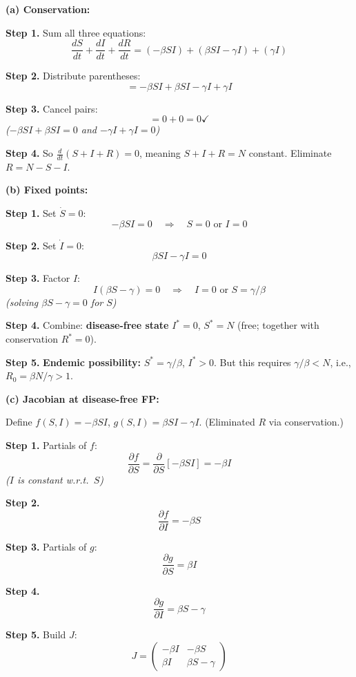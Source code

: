 \documentclass[10pt]{article}
\newcommand{\thus}{\quad\Longrightarrow\quad}
\newcommand{\stepwhy}[1]{\textcolor{blue!60!black}{\small\textit{(#1)}}}
\begin{document}
\begin{solution}
\textbf{(a) Conservation:}

\textbf{Step 1.} Sum all three equations:
\[
\frac{dS}{dt} + \frac{dI}{dt} + \frac{dR}{dt} = (-\beta SI) + (\beta SI - \gamma I) + (\gamma I)
\]

\textbf{Step 2.} Distribute parentheses:
\[
= -\beta SI + \beta SI - \gamma I + \gamma I
\]

\textbf{Step 3.} Cancel pairs:
\[
= 0 + 0 = 0 \checkmark
\]
\stepwhy{$-\beta SI + \beta SI = 0$ and $-\gamma I + \gamma I = 0$}

\textbf{Step 4.} So $\frac{d}{dt}(S+I+R) = 0$, meaning $S+I+R = N$ constant. Eliminate $R = N - S - I$.

\medskip\textbf{(b) Fixed points:}

\textbf{Step 1.} Set $\dot S = 0$:
\[
-\beta SI = 0 \thus S = 0 \text{ or } I = 0
\]

\textbf{Step 2.} Set $\dot I = 0$:
\[
\beta SI - \gamma I = 0
\]

\textbf{Step 3.} Factor $I$:
\[
I(\beta S - \gamma) = 0 \thus I = 0 \text{ or } S = \gamma/\beta
\]
\stepwhy{solving $\beta S - \gamma = 0$ for $S$}

\textbf{Step 4.} Combine: \textbf{disease-free state} $I^* = 0$, $S^* = N$ (free; together with conservation $R^* = 0$).

\textbf{Step 5.} \textbf{Endemic possibility:} $S^* = \gamma/\beta$, $I^* > 0$. But this requires $\gamma/\beta < N$, i.e., $R_0 = \beta N/\gamma > 1$.

\medskip\textbf{(c) Jacobian at disease-free FP:}

Define $f(S,I) = -\beta SI$, $g(S,I) = \beta SI - \gamma I$. (Eliminated $R$ via conservation.)

\textbf{Step 1.} Partials of $f$:
\[
\frac{\partial f}{\partial S} = \frac{\partial}{\partial S}[-\beta SI] = -\beta I
\]
\stepwhy{$I$ is constant w.r.t.\ $S$}

\textbf{Step 2.}
\[
\frac{\partial f}{\partial I} = -\beta S
\]

\textbf{Step 3.} Partials of $g$:
\[
\frac{\partial g}{\partial S} = \beta I
\]

\textbf{Step 4.}
\[
\frac{\partial g}{\partial I} = \beta S - \gamma
\]

\textbf{Step 5.} Build $J$:
\[
J = \begin{pmatrix} -\beta I & -\beta S \\ \beta I & \beta S - \gamma \end{pmatrix}
\]


\end{solution}
\end{document}
